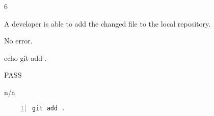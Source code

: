 \begin{description}[align=right,leftmargin=3.2cm,labelindent=3.0cm]
\item[Step:] 6
\item[Confirm:] A developer is able to add the changed file to the local repository.
\item[Expectation:] No error.
\item[Command:] echo git  add .
\item[Test Result:] PASS
\item[Evidence:] n/a
\end{description}
\begin{lstlisting}[numbers=left]
git add .

\end{lstlisting}
